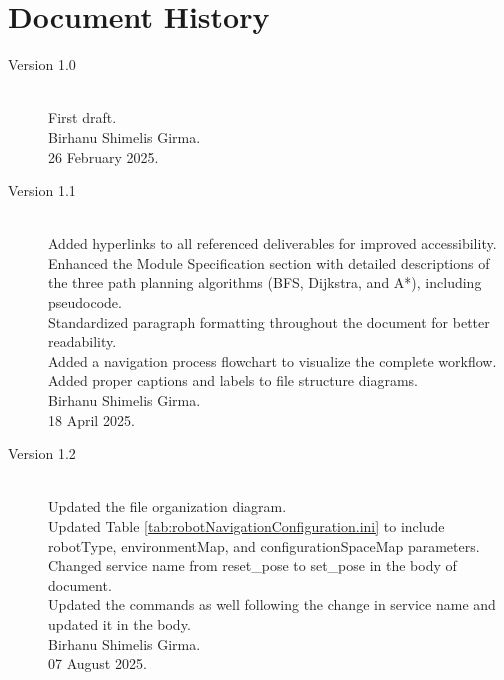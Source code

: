\documentclass{CSSRforAfrica}
\begin{document}
\newpage
\section*{Document History}
\label{document_history}

\begin{description}
	
	\item [Version 1.0]~\\
	First draft. \\
	Birhanu Shimelis Girma. \\
	26 February 2025.
	
	\item [Version 1.1]~\\
	Added hyperlinks to all referenced deliverables for improved accessibility. \\
	Enhanced the Module Specification section with detailed descriptions of the three path planning algorithms (BFS, Dijkstra, and A*), including pseudocode. \\
	Standardized paragraph formatting throughout the document for better readability. \\
	Added a navigation process flowchart to visualize the complete workflow. \\
	Added proper captions and labels to file structure diagrams. \\
	Birhanu Shimelis Girma. \\
	18 April 2025.
		
	\item [Version 1.2]~\\
	Updated the file organization diagram. \\
	Updated Table \ref{tab:robotNavigationConfiguration.ini} to include robotType, environmentMap, and configurationSpaceMap parameters.\\
	Changed service name from reset\_pose to set\_pose in the body of document. \\
	Updated the commands as well following the change in service name and updated it in the body. \\
	Birhanu Shimelis Girma. \\
	07 August 2025.


\end{description}
\end{document}
